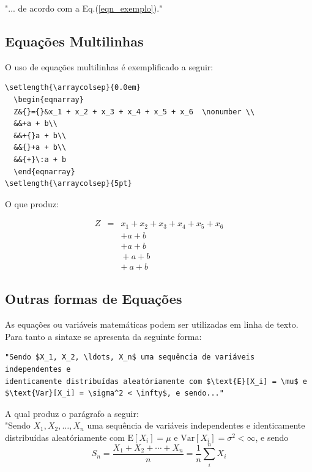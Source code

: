 \documentclass[12pt,A4,A4pt]{article}
\begin{document}
{"... de acordo com a Eq.(\ref{eqn_exemplo})."


\subsection{Equações Multilinhas}

O uso de equações multilinhas é exemplificado a seguir:

\begin{verbatim}
\setlength{\arraycolsep}{0.0em}
  \begin{eqnarray}
  Z&{}={}&x_1 + x_2 + x_3 + x_4 + x_5 + x_6  \nonumber \\
  &&+a + b\\
  &&+{}a + b\\
  &&{}+a + b\\
  &&{+}\:a + b
  \end{eqnarray}
\setlength{\arraycolsep}{5pt}
\end{verbatim}

O que produz:

\setlength{\arraycolsep}{0.0em}
\begin{eqnarray}
Z&{}={}&x_1 + x_2 + x_3 + x_4 + x_5 + x_6  \nonumber \\
&&+a + b\\
&&+{}a + b\\
&&{}+a + b\\
&&{+}\:a + b
\end{eqnarray}
\setlength{\arraycolsep}{5pt}

\subsection{Outras formas de Equações}

As equações ou variáveis matemáticas podem ser utilizadas em linha de texto. Para tanto a sintaxe se apresenta da seguinte forma:

\begin{verbatim}
"Sendo $X_1, X_2, \ldots, X_n$ uma sequência de variáveis independentes e
identicamente distribuídas aleatóriamente com $\text{E}[X_i] = \mu$ e
$\text{Var}[X_i] = \sigma^2 < \infty$, e sendo..."
\end{verbatim}

A qual produz o parágrafo a seguir:\\


"Sendo $X_1, X_2, \ldots, X_n$ uma sequência de variáveis independentes e identicamente distribuídas aleatóriamente com $\text{E}[X_i] = \mu$ e $\text{Var}[X_i] = \sigma^2 < \infty$, e sendo
\begin{equation}
S_n = \frac{X_1 + X_2 + \cdots + X_n}{n}
      = \frac{1}{n}\sum_{i}^{n} X_i
\label{eq:refname1}
\end{equation}

}
\end{document}
